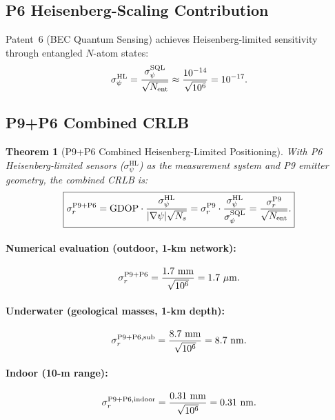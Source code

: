 \documentclass[aps,prd,twocolumn,superscriptaddress,nofootinbib]{revtex4-2}
\newcommand{\SQL}{\mathrm{SQL}}
\newcommand{\HL}{\mathrm{HL}}
\newtheorem{theorem}{Theorem}
\begin{document}
\subsection{P6 Heisenberg-Scaling Contribution}

Patent~6 (BEC Quantum Sensing) achieves Heisenberg-limited
sensitivity through entangled $N$-atom states:
\begin{equation}
  \sigma_\psi^{\HL} = \frac{\sigma_\psi^{\SQL}}{\sqrt{N_{\rm ent}}}
  \approx \frac{10^{-14}}{\sqrt{10^6}} = 10^{-17}.
  \label{eq:hl-sensitivity}
\end{equation}

\subsection{P9+P6 Combined CRLB}

\begin{theorem}[P9+P6 Combined Heisenberg-Limited Positioning]
\label{thm:p9p6-crlb}
With P6 Heisenberg-limited sensors ($\sigma_\psi^{\HL}$) as the
measurement system and P9 emitter geometry, the combined CRLB is:
\begin{equation}
  \boxed{
  \sigma_r^{\rm P9+P6} = \mathrm{GDOP} \cdot
  \frac{\sigma_\psi^{\HL}}{|\nabla\psi|\sqrt{N_s}}
  = \sigma_r^{\rm P9} \cdot \frac{\sigma_\psi^{\HL}}{\sigma_\psi^{\SQL}}
  = \frac{\sigma_r^{\rm P9}}{\sqrt{N_{\rm ent}}}.
  }
  \label{eq:p9p6-crlb}
\end{equation}
\end{theorem}

\paragraph{Numerical evaluation (outdoor, 1-km network):}
\begin{equation}
  \sigma_r^{\rm P9+P6} = \frac{1.7~\mathrm{mm}}{\sqrt{10^6}}
  = 1.7~\mu\mathrm{m}.
  \label{eq:p9p6-outdoor}
\end{equation}

\paragraph{Underwater (geological masses, 1-km depth):}
\begin{equation}
  \sigma_r^{\rm P9+P6,\rm sub} = \frac{8.7~\mathrm{mm}}{\sqrt{10^6}}
  = 8.7~\mathrm{nm}.
  \label{eq:p9p6-sub}
\end{equation}

\paragraph{Indoor (10-m range):}
\begin{equation}
  \sigma_r^{\rm P9+P6,\rm indoor} = \frac{0.31~\mathrm{mm}}{\sqrt{10^6}}
  = 0.31~\mathrm{nm}.
  \label{eq:p9p6-indoor}
\end{equation}
\end{document}
